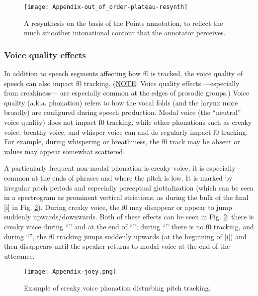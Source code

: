 \begin{figure}[H]
\centering
%
\texttt{[image: Appendix-out\_of\_order-plateau-resynth]}
%
\caption{A resynthesis on the basis of the Points annotation, to reflect the much smoother intonational contour that the annotator perceives.%
\label{fig:out of order-plateau f0-tracking}%
}
\end{figure}


\subsubsection{Voice quality effects}\label{sec:voice-quality-effects}
In addition to speech segments affecting how f0 is tracked, the voice quality of speech can also impact f0 tracking. (\uline{NOTE}: Voice quality effects —especially from creakiness— are especially common at the edges of prosodic groups.) Voice quality (a.k.a. phonation) refers to how the vocal folds (and the larynx more broadly) are configured during speech production. Modal voice (the “neutral” voice quality) does not impact f0 tracking, while other phonations such as creaky voice, breathy voice, and whisper voice can and do regularly impact f0 tracking. For example, during whispering or breathiness, the f0 track may be absent or values may appear somewhat scattered. 

A particularly frequent non-modal phonation is creaky voice; it is especially common at the ends of phrases and where the pitch is low. It is marked by irregular pitch periods and especially perceptual glottalization (which can be seen in a spectrogram as prominent vertical striations, as during the bulk of the final [i] in Fig. \ref{fig:joey f0-tracking}). During creaky voice, the f0 may disappear or appear to jump suddenly upwards\slash downwards. Both of these effects can be seen in Fig. \ref{fig:joey f0-tracking}: there is creaky voice during “” and at the end of “”; during “” there is no f0 tracking, and during “”, the f0 tracking jumps suddenly upwards (at the beginning of [i]) and then disappears until the speaker returns to modal voice at the end of the utterance.

\begin{figure}[H]
\centering
%
\texttt{[image: Appendix-joey.png]}
%
\caption{Example of creaky voice phonation disturbing pitch tracking.%
\label{fig:joey f0-tracking}%
%
}
\end{figure}

